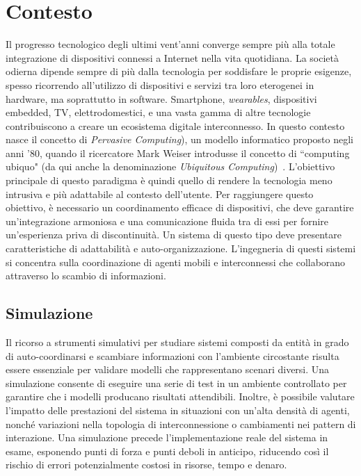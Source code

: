 \section{Contesto}
Il progresso tecnologico degli ultimi vent'anni converge sempre più alla totale integrazione di dispositivi connessi a Internet nella vita quotidiana. La società odierna dipende sempre di più dalla tecnologia per soddisfare le proprie esigenze, spesso ricorrendo all'utilizzo di dispositivi e servizi tra loro eterogenei in hardware, ma soprattutto in software. Smartphone, \textit{wearables}, dispositivi embedded, TV, elettrodomestici, e una vasta gamma di altre tecnologie contribuiscono a creare un ecosistema digitale interconnesso. In questo contesto nasce il concetto di \textit{Pervasive Computing}), un modello informatico proposto negli anni '80, quando il ricercatore Mark Weiser introdusse il concetto di ``computing ubiquo" (da qui anche la denominazione \textit{Ubiquitous Computing})~\cite{Weiser2002}.
L'obiettivo principale di questo paradigma è quindi quello di rendere la tecnologia meno intrusiva e più adattabile al contesto dell'utente.   Per raggiungere questo obiettivo, è necessario un coordinamento efficace di dispositivi, che deve garantire un'integrazione armoniosa e una comunicazione fluida tra di essi per fornire un'esperienza priva di discontinuità. Un sistema di questo tipo deve presentare caratteristiche di adattabilità e auto-organizzazione.
L'ingegneria di questi sistemi si concentra sulla coordinazione di agenti mobili e interconnessi che collaborano attraverso lo scambio di informazioni.
\subsection{Simulazione}

Il ricorso a strumenti simulativi per studiare sistemi composti da entità in grado di auto-coordinarsi e scambiare informazioni con l'ambiente circostante risulta essere essenziale per validare modelli che rappresentano scenari diversi. Una simulazione consente di eseguire una serie di test in un ambiente controllato per garantire che i modelli producano risultati attendibili. Inoltre, è possibile valutare l'impatto delle prestazioni del sistema in situazioni con un'alta densità di agenti, nonché variazioni nella topologia di interconnessione o cambiamenti nei pattern di interazione. Una simulazione precede l'implementazione reale del sistema in esame, esponendo punti di forza e punti deboli in anticipo, riducendo così il rischio di errori potenzialmente costosi in risorse, tempo e denaro.



